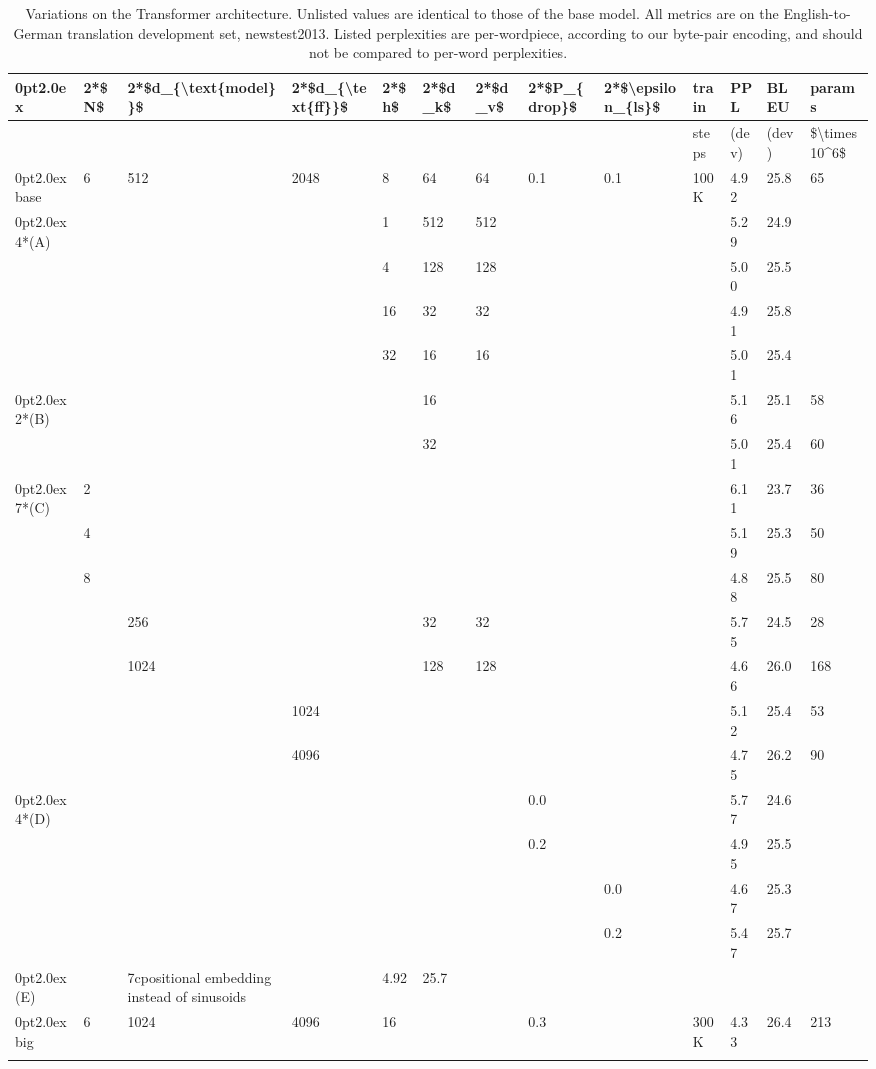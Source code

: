 \documentclass[11pt,a4paper]{article}
\begin{document}
\begin{table}[h]
\caption{Variations on the Transformer architecture. Unlisted values are identical to those of the base model.  All metrics are on the English-to-German translation development set, newstest2013.  Listed perplexities are per-wordpiece, according to our byte-pair encoding, and should not be compared to per-word perplexities.}
\begin{tabular}{|l|l|l|l|l|l|l|l|l|l|l|l|l|}
\hline
0pt2.0ex & 2*\$N\$ & 2*\$d\_\{\textbackslash{}text\{model\}\}\$ & 2*\$d\_\{\textbackslash{}text\{ff\}\}\$ & 2*\$h\$ & 2*\$d\_k\$ & 2*\$d\_v\$ & 2*\$P\_\{drop\}\$ & 2*\$\textbackslash{}epsilon\_\{ls\}\$ & train & PPL & BLEU & params \\ \hline
 &  &  &  &  &  &  &  &  & steps & (dev) & (dev) & \$\textbackslash{}times10\textasciicircum{}6\$ \\ \hline
0pt2.0ex base & 6 & 512 & 2048 & 8 & 64 & 64 & 0.1 & 0.1 & 100K & 4.92 & 25.8 & 65 \\ \hline
0pt2.0ex 4*(A) &  &  &  & 1 & 512 & 512 &  &  &  & 5.29 & 24.9 &  \\ \hline
 &  &  &  & 4 & 128 & 128 &  &  &  & 5.00 & 25.5 &  \\ \hline
 &  &  &  & 16 & 32 & 32 &  &  &  & 4.91 & 25.8 &  \\ \hline
 &  &  &  & 32 & 16 & 16 &  &  &  & 5.01 & 25.4 &  \\ \hline
0pt2.0ex 2*(B) &  &  &  &  & 16 &  &  &  &  & 5.16 & 25.1 & 58 \\ \hline
 &  &  &  &  & 32 &  &  &  &  & 5.01 & 25.4 & 60 \\ \hline
0pt2.0ex 7*(C) & 2 &  &  &  &  &  &  &  &  & 6.11 & 23.7 & 36 \\ \hline
 & 4 &  &  &  &  &  &  &  &  & 5.19 & 25.3 & 50 \\ \hline
 & 8 &  &  &  &  &  &  &  &  & 4.88 & 25.5 & 80 \\ \hline
 &  & 256 &  &  & 32 & 32 &  &  &  & 5.75 & 24.5 & 28 \\ \hline
 &  & 1024 &  &  & 128 & 128 &  &  &  & 4.66 & 26.0 & 168 \\ \hline
 &  &  & 1024 &  &  &  &  &  &  & 5.12 & 25.4 & 53 \\ \hline
 &  &  & 4096 &  &  &  &  &  &  & 4.75 & 26.2 & 90 \\ \hline
0pt2.0ex 4*(D) &  &  &  &  &  &  & 0.0 &  &  & 5.77 & 24.6 &  \\ \hline
 &  &  &  &  &  &  & 0.2 &  &  & 4.95 & 25.5 &  \\ \hline
 &  &  &  &  &  &  &  & 0.0 &  & 4.67 & 25.3 &  \\ \hline
 &  &  &  &  &  &  &  & 0.2 &  & 5.47 & 25.7 &  \\ \hline
0pt2.0ex (E) &  & 7cpositional embedding instead of sinusoids &  & 4.92 & 25.7 &  &  &  &  &  &  &  \\ \hline
0pt2.0ex big & 6 & 1024 & 4096 & 16 &  &  & 0.3 &  & 300K & 4.33 & 26.4 & 213 \\ \hline
 &  &  &  &  &  &  &  &  &  &  &  &  \\ \hline
\end{tabular}
\end{table}
\end{document}
